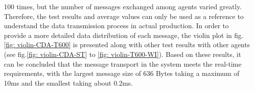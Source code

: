 100 times, but the number of messages exchanged among agents varied greatly. Therefore, 
the test results and average values can only be used as a reference to understand the 
data transmission process in actual production. In order to provide a more detailed data 
distribution of each message, the violin plot in fig.\ref{fig: violin-CDA-T600} is 
presented along with other test results with other agents (see fig.\ref{fig: violin-CDA-ST} to \ref{fig: violin-T600-WI}). 
Based on these results, it can be concluded that the message transport in the system meets 
the real-time requirements, with the largest message size of 636 Bytes taking a maximum of 
10ms and the smallest taking about 0.2ms.



